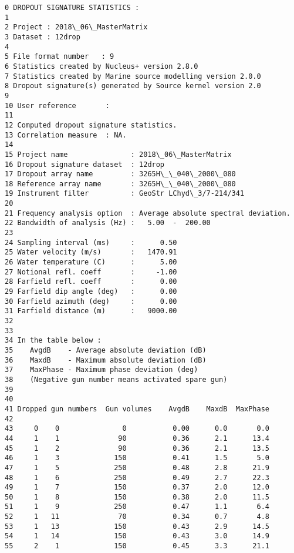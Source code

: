 \documentclass[11pt]{article}
\begin{document}
    \begin{Verbatim}[commandchars=\\\{\}]
0 DROPOUT SIGNATURE STATISTICS :
1 
2 Project : 2018\_06\_MasterMatrix
3 Dataset : 12drop
4 
5 File format number   : 9
6 Statistics created by Nucleus+ version 2.8.0
7 Statistics created by Marine source modelling version 2.0.0
8 Dropout signature(s) generated by Source kernel version 2.0
9 
10 User reference       : 
11 
12 Computed dropout signature statistics.
13 Correlation measure  : NA.
14 
15 Project name               : 2018\_06\_MasterMatrix
16 Dropout signature dataset  : 12drop
17 Dropout array name         : 3265H\_\_040\_2000\_080
18 Reference array name       : 3265H\_\_040\_2000\_080
19 Instrument filter          : GeoStr LChyd\_3/7-214/341
20 
21 Frequency analysis option  : Average absolute spectral deviation.
22 Bandwidth of analysis (Hz) :   5.00  -  200.00
23 
24 Sampling interval (ms)     :      0.50
25 Water velocity (m/s)       :   1470.91
26 Water temperature (C)      :      5.00
27 Notional refl. coeff       :     -1.00
28 Farfield refl. coeff       :      0.00
29 Farfield dip angle (deg)   :      0.00
30 Farfield azimuth (deg)     :      0.00
31 Farfield distance (m)      :   9000.00
32 
33 
34 In the table below :
35    AvgdB    - Average absolute deviation (dB)
36    MaxdB    - Maximum absolute deviation (dB)
37    MaxPhase - Maximum phase deviation (deg)
38    (Negative gun number means activated spare gun)
39 
40 
41 Dropped gun numbers  Gun volumes    AvgdB    MaxdB  MaxPhase
42 
43     0    0               0           0.00      0.0       0.0
44     1    1              90           0.36      2.1      13.4
45     1    2              90           0.36      2.1      13.5
46     1    3             150           0.41      1.5       5.0
47     1    5             250           0.48      2.8      21.9
48     1    6             250           0.49      2.7      22.3
49     1    7             150           0.37      2.0      12.0
50     1    8             150           0.38      2.0      11.5
51     1    9             250           0.47      1.1       6.4
52     1   11              70           0.34      0.7       4.8
53     1   13             150           0.43      2.9      14.5
54     1   14             150           0.43      3.0      14.9
55     2    1             150           0.45      3.3      21.1

    \end{Verbatim}
\end{document}
